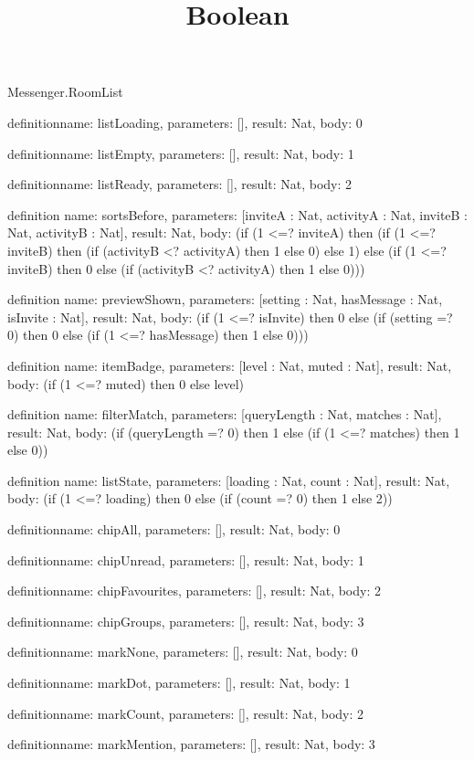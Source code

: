 \begin{lexlean}{Messenger.RoomList}
\title{Boolean}
\begin{semanticmodule}
definition{name: listLoading, parameters: [], result: Nat, body: 0}

definition{name: listEmpty, parameters: [], result: Nat, body: 1}

definition{name: listReady, parameters: [], result: Nat, body: 2}

definition{
  name: sortsBefore,
  parameters: [inviteA : Nat, activityA : Nat, inviteB : Nat, activityB : Nat],
  result: Nat,
  body: (if (1 <=? inviteA) then (if (1 <=? inviteB) then (if (activityB <? activityA) then 1 else 0) else 1) else (if (1 <=? inviteB) then 0 else (if (activityB <? activityA) then 1 else 0)))
}

definition{
  name: previewShown,
  parameters: [setting : Nat, hasMessage : Nat, isInvite : Nat],
  result: Nat,
  body: (if (1 <=? isInvite) then 0 else (if (setting =? 0) then 0 else (if (1 <=? hasMessage) then 1 else 0)))
}

definition{
  name: itemBadge,
  parameters: [level : Nat, muted : Nat],
  result: Nat,
  body: (if (1 <=? muted) then 0 else level)
}

definition{
  name: filterMatch,
  parameters: [queryLength : Nat, matches : Nat],
  result: Nat,
  body: (if (queryLength =? 0) then 1 else (if (1 <=? matches) then 1 else 0))
}

definition{
  name: listState,
  parameters: [loading : Nat, count : Nat],
  result: Nat,
  body: (if (1 <=? loading) then 0 else (if (count =? 0) then 1 else 2))
}

definition{name: chipAll, parameters: [], result: Nat, body: 0}

definition{name: chipUnread, parameters: [], result: Nat, body: 1}

definition{name: chipFavourites, parameters: [], result: Nat, body: 2}

definition{name: chipGroups, parameters: [], result: Nat, body: 3}

definition{name: markNone, parameters: [], result: Nat, body: 0}

definition{name: markDot, parameters: [], result: Nat, body: 1}

definition{name: markCount, parameters: [], result: Nat, body: 2}

definition{name: markMention, parameters: [], result: Nat, body: 3}


\end{semanticmodule}
\end{lexlean}
